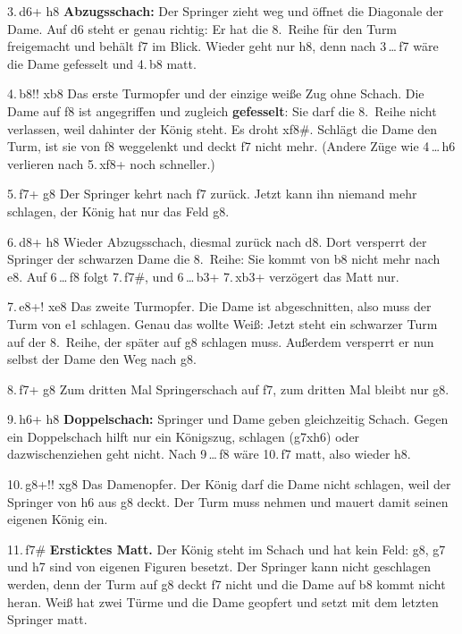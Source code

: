 {3.\,\Sp d6+ \quad \K h8}
{\textbf{Abzugsschach:} Der Springer zieht weg und öffnet die Diagonale der Dame.
	Auf d6 steht er genau richtig: Er hat die 8.~Reihe für den Turm freigemacht und behält f7 im Blick.
	Wieder geht nur \K h8, denn nach 3\,\ldots\,\D f7 wäre die Dame gefesselt und 4.\,\T b8 matt.}

{4.\,\T b8!! \quad \D xb8}
{Das erste Turmopfer und der einzige weiße Zug ohne Schach. Die Dame auf f8 ist angegriffen und zugleich
	\textbf{gefesselt}: Sie darf die 8.~Reihe nicht verlassen, weil dahinter der König steht.
	Es droht \T xf8\#. Schlägt die Dame den Turm, ist sie von f8 weggelenkt und deckt f7 nicht mehr.
	(Andere Züge wie 4\,\ldots\,h6 verlieren nach 5.\,\T xf8+ noch schneller.)}

{5.\,\Sp f7+ \quad \K g8}
{Der Springer kehrt nach f7 zurück. Jetzt kann ihn niemand mehr schlagen, der König hat nur das Feld g8.}

{6.\,\Sp d8+ \quad \K h8}
{Wieder Abzugsschach, diesmal zurück nach d8. Dort versperrt der Springer der schwarzen Dame die
	8.~Reihe: Sie kommt von b8 nicht mehr nach e8. Auf 6\,\ldots\,\K f8 folgt 7.\,\D f7\#, und
	6\,\ldots\,\D b3+ 7.\,\D xb3+ verzögert das Matt nur.}

{7.\,\T e8+! \quad \T xe8}
{Das zweite Turmopfer. Die Dame ist abgeschnitten, also muss der Turm von e1 schlagen. Genau das
	wollte Weiß: Jetzt steht ein schwarzer Turm auf der 8.~Reihe, der später auf g8 schlagen muss.
	Außerdem versperrt er nun selbst der Dame den Weg nach g8.}

{8.\,\Sp f7+ \quad \K g8}
{Zum dritten Mal Springerschach auf f7, zum dritten Mal bleibt nur \K g8.}

{9.\,\Sp h6+ \quad \K h8}
{\textbf{Doppelschach:} Springer und Dame geben gleichzeitig Schach. Gegen ein Doppelschach hilft nur
	ein Königszug, schlagen (g7xh6) oder dazwischenziehen geht nicht. Nach 9\,\ldots\,\K f8 wäre
	10.\,\D f7 matt, also wieder \K h8.}

{10.\,\D g8+!! \quad \T xg8}
{Das Damenopfer. Der König darf die Dame nicht schlagen, weil der Springer von h6 aus g8 deckt.
	Der Turm muss nehmen und mauert damit seinen eigenen König ein.}

{11.\,\Sp f7\#}
{\textbf{Ersticktes Matt.} Der König steht im Schach und hat kein Feld: g8, g7 und h7 sind von
	eigenen Figuren besetzt. Der Springer kann nicht geschlagen werden, denn der Turm auf g8 deckt f7
	nicht und die Dame auf b8 kommt nicht heran. Weiß hat zwei Türme und die Dame geopfert und setzt
	mit dem letzten Springer matt.}



